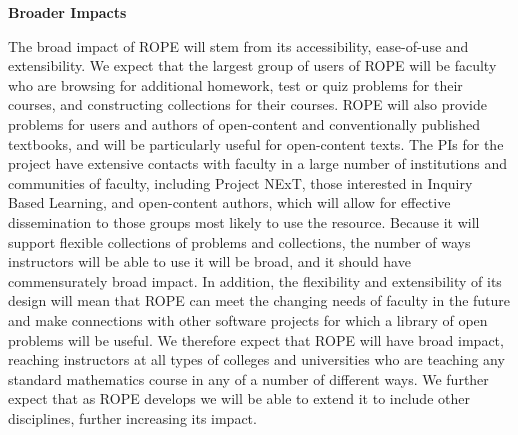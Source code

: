 \documentclass[11pt]{article}
\begin{document}
\bigskip\bigskip
\noindent
{\large \textbf{Broader Impacts}}

The broad impact of ROPE will stem from its accessibility, ease-of-use and
extensibility.  We expect that the largest group of users of ROPE will be
faculty who are browsing for additional homework, test or quiz problems
for their courses, and constructing collections for their courses.  ROPE
will also provide problems for users and authors of open-content and
conventionally published textbooks, and will be particularly useful for
open-content texts.  The PIs for the project have extensive contacts with
faculty in a large number of institutions and communities of faculty,
including Project NExT, those interested in Inquiry Based Learning, and
open-content authors, which will allow for effective dissemination to
those groups most likely to use the resource.  Because it will support
flexible collections of problems and collections, the number of ways
instructors will be able to use it will be broad, and it should have
commensurately broad impact.  In addition, the flexibility and
extensibility of its design will mean that ROPE can meet the changing
needs of faculty in the future and make connections with other software
projects for which a library of open problems will be useful.  We
therefore expect that ROPE will have broad impact, reaching instructors at
all types of colleges and universities who are teaching any standard
mathematics course in any of a number of different ways.  We further
expect that as ROPE develops we will be able to extend it to include other
disciplines, further increasing its impact.
\end{document}
